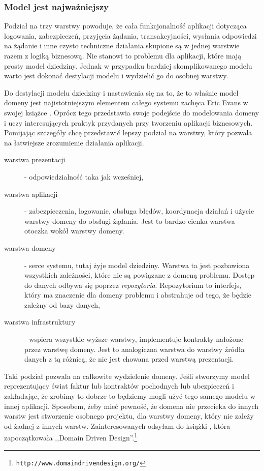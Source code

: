 \documentclass[a4paper,onecolumn,oneside,11pt,wide,floatssmall]{mwrep}
\def\url#1{{ \tt #1}}
\theoremstyle{definition}
\theoremstyle{plain}%
\theoremstyle{remark}
\begin{document}
\subsubsection{Model jest najważniejszy}
Podział na trzy warstwy powoduje, że cała funkcjonalność aplikacji dotycząca logowania, zabezpieczeń, przyjęcia 
żądania, transakcyjności, wysłania odpowiedzi na żądanie i inne czysto techniczne działania skupione są w jednej 
warstwie razem z logiką biznesową. Nie stanowi to problemu dla aplikacji, które mają prosty model dziedziny. Jednak w 
przypadku bardziej skomplikowanego modelu warto jest dokonać destylacji modelu i wydzielić go do osobnej warstwy. 

Do destylacji modelu dziedziny i nastawienia się na to, że to właśnie model domeny jest najistotniejszym elementem 
całego systemu zachęca Eric Evans w swojej książce \cite{evans2004domain}. Oprócz tego przedstawia swoje podejście do 
modelowania domeny i uczy interesujących praktyk przydanych przy tworzeniu aplikacji biznesowych. Pomijając szczegóły 
chcę przedstawić lepszy podział na warstwy, który pozwala na łatwiejsze zrozumienie działania aplikacji.

\begin{description}
  \item[warstwa prezentacji] - odpowiedzialność taka jak wcześniej,
  \item[warstwa aplikacji] - zabezpieczenia, logowanie, obsługa błędów, koordynacja działań i użycie warstwy domeny do 
  obsługi żądania. Jest to bardzo cienka warstwa - otoczka wokół warstwy domeny.
  \item[warstwa domeny] - serce systemu, tutaj żyje model dziedziny. Warstwa ta jest pozbawiona wszystkich zależności, 
  które nie są powiązane z domeną problemu. Dostęp do danych odbywa się poprzez \emph{repozytoria}. Repozytorium to 
  interfejs, który ma znaczenie dla domeny problemu i abstrahuje od tego, że będzie zależny od bazy danych,
  \item[warstwa infrastruktury] - wspiera wszystkie wyższe warstwy, implementuje kontrakty nałożone przez warstwę 
  domeny. Jest to analogiczna warstwa do warstwy źródła danych z tą różnicą, że nie jest chowana przed warstwą 
  prezentacji.
\end{description}

Taki podział pozwala na całkowite wydzielenie domeny. Jeśli stworzymy model reprezentujący świat faktur lub kontraktów 
pochodnych lub ubezpieczeń i zakładając, że zrobimy to dobrze to będziemy mogli użyć tego samego modelu w innej 
aplikacji. Sposobem, żeby mieć pewność, że domena nie przecieka do innych warstw jest stworzenie osobnego projektu, 
dla warstwy domeny, który nie zależy od żadnej z innych warstw. Zainteresowanych odsyłam do książki \cite{
evans2004domain}, która zapoczątkowała ,,Domain Driven Design''.\footnote{\url{http://www.domaindrivendesign.org/}}
\end{document}
